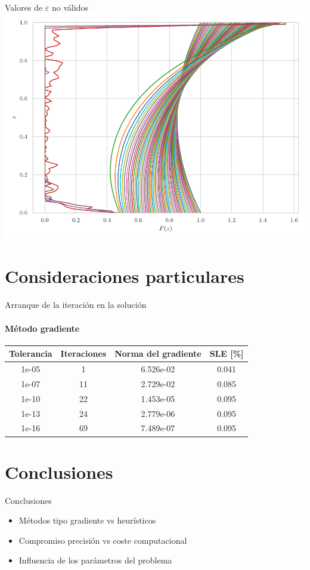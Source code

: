 \documentclass[11pt]{beamer}
\begin{document}
            \begin{frame}{Valores de $\varepsilon$ no válidos}
                \centering
                \includegraphics[width = 0.8 \linewidth]{Figuras/sol_var_epsn100_cont.pdf}
            \end{frame}

        \section{Consideraciones particulares}
            \begin{frame}{Arranque de la iteración en la solución}
            \framesubtitle{Método gradiente}
                \centering
                \begin{tabular}{|c|c|c|c|}
                    \hline
                    \textbf{Tolerancia} & \textbf{Iteraciones} & \textbf{Norma del gradiente} & \textbf{SLE [\%]} \\ \hline \hline
                    1e-05 &  1 & 6.526e-02 & 0.041 \\ \hline
                    1e-07 & 11 & 2.729e-02 & 0.085 \\ \hline
                    1e-10 & 22 & 1.453e-05 & 0.095 \\ \hline
                    1e-13 & 24 & 2.779e-06 & 0.095 \\ \hline
                    1e-16 & 69 & 7.489e-07 & 0.095 \\ \hline
                \end{tabular}                
            \end{frame}

        \section{Conclusiones}
            \begin{frame}{Conclusiones}
            \justifying
            \begin{itemize}
                \item Métodos tipo gradiente vs heurísticos
                \item Compromiso precisión vs coste computacional
                \item Influencia de los parámetros del problema
            \end{itemize}
                
            \end{frame}
	
\end{document}

